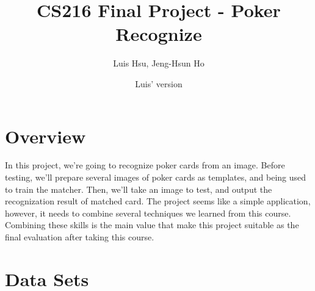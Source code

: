 \documentclass{article}
\title{CS216 Final Project - Poker Recognize}
\author{Luis Hsu, Jeng-Hsun Ho}
\date{Luis' version}
\begin{document}
\maketitle

\setlength{\fboxrule}{0pt}

\section*{Overview}

In this project, we're going to recognize poker cards from an image. Before testing, we'll prepare several images of poker cards as templates, and being used to train the matcher. Then, we'll take an image to test, and output the recognization result of matched card. The project seems like a simple application, however, it needs to combine several techniques we learned from this course. Combining these skills is the main value that make this project suitable as the final evaluation after taking this course.

\section*{Data Sets}
\end{document}
